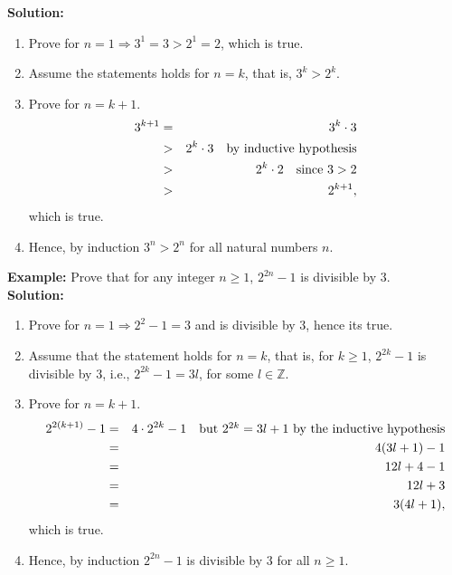 \documentclass[titlepage,a4paper,12pt]{report}
\begin{document}
 \textbf{Solution:} 
\begin{enumerate}
\item Prove for $n=1 \Longrightarrow 3^1=3>2^1=2$, which is true.
\item Assume the statements holds for $n=k$, that is, $3^k>2^k$.
\item Prove for $n=k+1$. 
\begin{eqnarray*}
3^{k+1} &=& 3^k\cdot 3\\
&>& 2^k \cdot 3 \quad \hbox{by inductive hypothesis}\\
&>& 2^k\cdot 2 \quad \hbox{since $3>2$}\\
&>& 2^{k+1},
\end{eqnarray*}
which is true.
\item Hence, by induction $3^n>2^n$ for all natural numbers $n$.
\end{enumerate}
\textbf{Example:} Prove that for any integer $n\geq 1$, $2^{2n}-1$ is divisible by $3$.\\
\textbf{Solution:}
\begin{enumerate}
\item Prove for $n=1 \Longrightarrow 2^2-1=3$ and is divisible by $3$, hence its true.
\item Assume that the statement holds for $n=k$, that is, for $k\geq 1$, $2^{2k}-1$ is divisible by $3$, i.e., $2^{2k}-1=3l$, for some $l\in \mathbb{Z}$.
\item Prove for $n=k+1$.
\begin{eqnarray*}
2^{2(k+1)}-1 &=& 4\cdot 2^{2k} -1 \quad \hbox{but $2^{2k}=3l+1$ by the inductive hypothesis}\\
&=& 4(3l+1)-1\\
&=& 12l+4-1\\
&=& 12l+3\\
&=& 3(4l+1), 
\end{eqnarray*}
which is true.
\item Hence, by induction $2^{2n}-1$ is divisible by $3$ for all $n\geq 1$.
\end{enumerate}
\end{document}
